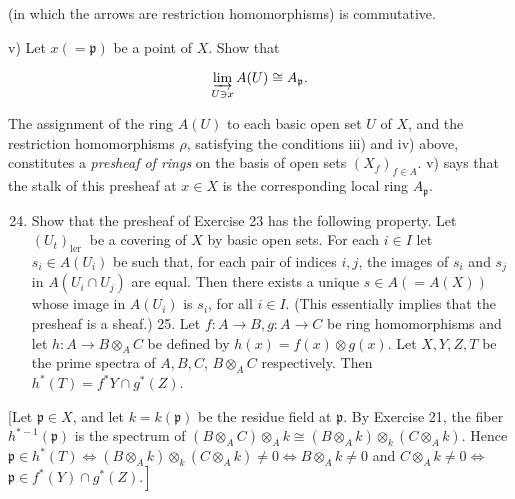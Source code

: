 \documentclass{standalone}
\theoremstyle{definition}
\theoremstyle{remark}
\begin{document}
\begin{center}
\end{center}

(in which the arrows are restriction homomorphisms) is commutative.

v) Let $x(=\mathfrak{p})$ be a point of $X$. Show that

\[
\varinjlim_{U\ni x} A(U) \cong A_{\mathfrak{p}}.
\]

The assignment of the ring $A(U)$ to each basic open set $U$ of $X$, and the restriction homomorphisms $\rho$, satisfying the conditions iii) and iv) above, constitutes a \textit{presheaf of rings} on the basis of open sets $\left(X_{f}\right)_{f\in A}$. v) says that the stalk of this presheaf at $x \in X$ is the corresponding local ring $A_{\mathfrak{p}}$.

\begin{enumerate}
  \setcounter{enumi}{23}
  \item Show that the presheaf of Exercise 23 has the following property. Let $\left(U_{t}\right)_{\text {ler }}$ be a covering of $X$ by basic open sets. For each $i \in I$ let $s_{i} \in A\left(U_{i}\right)$ be such that, for each pair of indices $i, j$, the images of $s_{i}$ and $s_{j}$ in $A\left(U_{i} \cap U_{j}\right)$ are equal. Then there exists a unique $s \in A(=A(X))$ whose image in $A\left(U_{i}\right)$ is $s_{i}$, for all $i \in I$. (This essentially implies that the presheaf is a sheaf.) 25. Let $f: A \rightarrow B, g: A \rightarrow C$ be ring homomorphisms and let $h: A \rightarrow B \otimes_{A} C$ be defined by $h(x)=f(x) \otimes g(x)$. Let $X, Y, Z, T$ be the prime spectra of $A, B, C$, $B \otimes_{A} C$ respectively. Then $h^{*}(T)=f^{*} Y \cap g^{*}(Z)$.
\end{enumerate}

[Let $\mathfrak{p} \in X$, and let $k=k(\mathfrak{p})$ be the residue field at $\mathfrak{p}$. By Exercise 21, the fiber $h^{*-1}(\mathfrak{p})$ is the spectrum of $\left(B \otimes_{A} C\right) \otimes_{A} k \cong\left(B \otimes_{A} k\right) \otimes_{k}\left(C \otimes_{A} k\right)$. Hence $\mathfrak{p} \in h^{*}(T) \Leftrightarrow\left(B \otimes_{A} k\right) \otimes_{k}\left(C \otimes_{A} k\right) \neq 0 \Leftrightarrow B \otimes_{A} k \neq 0$ and $C \otimes_{A} k \neq 0 \Leftrightarrow$ $\left.\mathfrak{p} \in f^{*}(Y) \cap g^{*}(Z).\right]$
\end{document}
